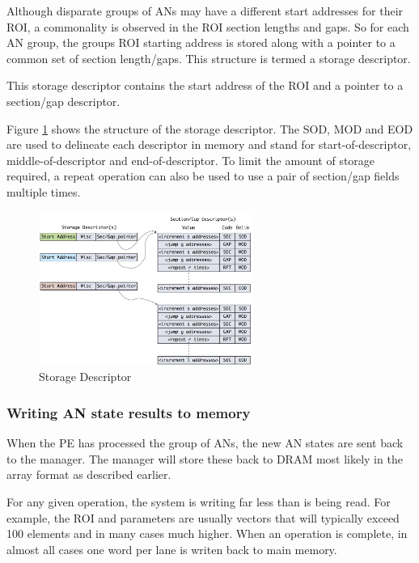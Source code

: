 \documentclass[journal]{IEEEtran}
\begin{document}
Although disparate groups of ANs may have a different start addresses for their ROI, a commonality is observed in the ROI section lengths and gaps. So for each AN group, the groups ROI starting address is stored along with a pointer to a common set of section length/gaps. This structure is termed a storage descriptor.

This storage descriptor contains the start address of the ROI and a pointer to a section/gap descriptor. 

Figure \ref{fig:storageDescriptor} shows the structure of the storage descriptor. The SOD, MOD and EOD are used to delineate each descriptor in memory and stand for start-of-descriptor, middle-of-descriptor and end-of-descriptor.
To limit the amount of storage required, a repeat operation can also be used to use a pair of section/gap fields multiple times.

\begin{figure}[!t]
\centerline{
\mbox{\includegraphics[width=2.75in]{storageDesc.jpg}}
}
\caption{Storage Descriptor}
\label{fig:storageDescriptor}
\end{figure}

\subsubsection{Writing AN state results to memory}
\label{ssec:writingANStates}

When the PE has processed the group of ANs, the new AN states are sent back to the manager. The manager will store these back to DRAM most likely in the array format as described earlier.

For any given operation, the system is writing far less than is being read. For example, the ROI and parameters are usually vectors that will typically exceed 100 elements and in many cases much higher. When an operation is complete, in almost all cases one word per lane is writen back to main memory. 

\end{document}

